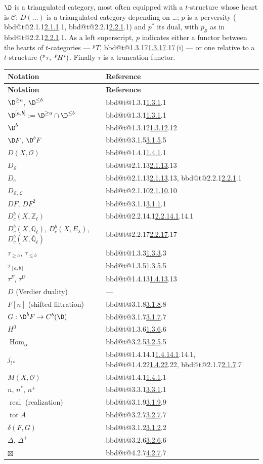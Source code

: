 \documentclass[12pt,oneside]{amsbook}
\makeatletter
\DeclareRobustCommand{\rn}[1]{%
  \ifcsname bbd@t@#1\endcsname\hyperlink{bbd:#1}{#1}\else#1\fi}
\theoremstyle{plain}
\theoremstyle{definition}
\newcommand{\LL}{\mathcal{L}}
\newcommand{\OO}{\mathcal{O}}
\renewcommand{\SS}{\mathcal{S}}
\newcommand{\cat}[1]{\mathcal{#1}}
\newcommand{\Zl}{\mathbb{Z}_{\ell}}
\newcommand{\Ql}{\mathbb{Q}_{\ell}}
\newcommand{\Qlb}{\overline{\mathbb{Q}}_{\ell}}
\newcommand{\Db}{D^{b}}
\newcommand{\lsup}[1]{{\vphantom{X}}^{#1}\mkern-1.5mu}
\newcommand{\pH}{\lsup{p}H}
\newcommand{\jshriek}{j_{!*}}
\DeclareMathOperator{\Hom}{Hom}
\DeclareMathOperator{\tot}{tot}
\DeclareMathOperator{\real}{real}
\makeatother
\begin{document}
\noindent$\D$ is a triangulated category, most often equipped with a $t$-structure whose heart is $\cat C$; $D(\dots)$ is a triangulated category depending on \dots; $p$ is a perversity (\rn{2.1.1}, \rn{2.2.1}) and $p^{*}$ its dual, with $p_{\SS}$ as in \rn{2.2.1}. As a left superscript, $p$ indicates either a functor between the hearts of $t$-categories --- ${}^{p}T$, \rn{1.3.17}\,(i) --- or one relative to a $t$-structure $({}^{p}\tau,\ \pH^{i})$. Finally $\tau$ is a truncation functor.

\begin{longtable}{@{}p{}p{}@{}}
\hline
\textbf{Notation} & \textbf{Reference}\\
\hline
\endfirsthead
\hline
\textbf{Notation} & \textbf{Reference}\\
\hline
\endhead
$\D^{\ge a}$, $\D^{\le b}$ & \rn{1.3.1}\\
$\D^{[a,b]}:=\D^{\ge a}\cap\D^{\le b}$ & \rn{1.3.1}\\
$\D^{b}$ & \rn{1.3.12}\\
$\D F$, $\D^{b}F$ & \rn{3.1.5}\\[3pt]
$D(X,\OO)$ & \rn{1.4.1}\\
$D_{\SS}$ & \rn{2.1.13}\\
$D_{c}$ & \rn{2.1.13}, \rn{2.2.1}\\
$D_{\SS,\LL}$ & \rn{2.1.10}\\
$DF$, $DF^{2}$ & \rn{3.1.1}\\
$\Db_{c}(X,\Zl)$ & \rn{2.2.14.1}\\
$\Db_{c}(X,\Ql)$, $\Db_{c}(X,E_{\lambda})$, $\Db_{c}(X,\Qlb)$ & \rn{2.2.17}\\[3pt]
$\tau_{\ge a}$, $\tau_{\le b}$ & \rn{1.3.3}\\
$\tau_{[a,b]}$ & \rn{1.3.5}\\
$\tau^{F}$, $\tau^{U}$ & \rn{1.4.13}\\[3pt]
$D$ (Verdier duality) & ---\\
$F[n]$ (shifted filtration) & \rn{3.1.8}\\
$G:\D^{b}F\to C^{b}(\D)$ & \rn{3.1.7}\\
$H^{0}$ & \rn{1.3.6}\\
$\Hom_{\alpha}$ & \rn{3.2.5}\\
$\jshriek$ & \rn{1.4.14.1}, \rn{1.4.22}, \rn{2.1.7}\\
$M(X,\OO)$ & \rn{1.4.1}\\
$n$, $n^{*}$, $n^{+}$ & \rn{3.3.1}\\
$\real$ (realization) & \rn{3.1.9}\\
$\tot A$ & \rn{3.2.7}\\
$\delta(F,G)$ & \rn{3.1.2}\\
$\Delta$, $\Delta^{+}$ & \rn{3.2.6}\\
$\boxtimes$ & \rn{4.2.7}\\
\hline
\end{longtable}
\end{document}
